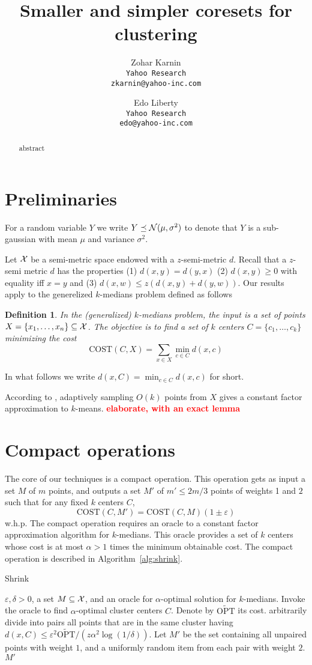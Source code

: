 \documentclass[11pt]{article}
\title{Smaller and simpler coresets for clustering}
\author{
Zohar Karnin\\ \texttt{Yahoo Research}\\ \texttt{\small zkarnin@yahoo-inc.com}
\and
Edo Liberty\\ \texttt{Yahoo Research}\\ \texttt{\small edo@yahoo-inc.com}
}
\date\nonumber
\newtheorem{definition} {Definition}
\newcommand{\eps}{\varepsilon}
\newcommand{\note}[1]{\textbf{\textcolor{red}{#1}}}
\newcommand{\cost}{\text{COST}}
\newcommand{\topt}{\widetilde{\text{OPT}}}
\newcommand{\N}{{\cal N}}
\begin{document}
\maketitle

\begin{abstract}
abstract\end{abstract}

\section{Preliminaries}
For a random variable $Y$ we write $Y \preceq \N(\mu,\sigma^2)$ to denote that $Y$ is a sub-gaussian with mean $\mu$ and variance $\sigma^2$.

Let $\cal X$ be a semi-metric space endowed with a $z$-semi-metric $d$. Recall that a $z$-semi metric $d$ has the properties (1) $d(x,y)=d(y,x)$ (2) $d(x,y) \geq 0$ with equality iff $x=y$ and (3) $d(x,w) \leq z(d(x,y)+d(y,w))$. Our results apply to the generelized $k$-medians problem defined as follows
\begin{definition}
In the (generalized) $k$-medians problem, the input is a set of points $X = \{x_1,\ldots,x_n\} \subseteq {\cal X}$. The objective is to find a set of $k$ centers $C = \{c_1,\ldots,c_k\}$ minimizing the cost 
$$\cost(C,X) = \sum_{x \in X} \min_{c \in C} d(x,c)$$
\end{definition}
In what follows we write $d(x,C) = \min_{c \in C}d(x,c)$ for short.

According to \cite{AggarwalDK09}, adaptively sampling $O(k)$ points from $X$ gives a constant factor approximation to $k$-means.
\note{elaborate, with an exact lemma}

\section{Compact operations}
The core of our techniques is a compact operation. This operation gets as input a set $M$ of $m$ points, and outputs a set $M'$ of $m' \leq 2m/3$ points of weights 1 and $2$ such that for any fixed $k$ centers $C$,
$$ \cost(C,M') = \cost(C,M) (1 \pm \eps) $$
w.h.p. The compact operation requires an oracle to a constant factor approximation algorithm for $k$-medians. This oracle provides a set of $k$ centers whose cost is at most $\alpha>1$ times the minimum obtainable cost.
The compact operation is described in Algorithm~\ref{alg:shrink}.


\begin{algorithm} 
\begin{algorithmic}
\caption{Shrink} \label{alg:shrink}
 $\eps,\delta >0$, a set $M \subseteq {\cal X}$, and an oracle for $\alpha$-optimal solution for $k$-medians.
\State Invoke the oracle to find $\alpha$-optimal cluster centers $C$. Denote by $\topt$ its cost.
\State arbitrarily divide into pairs all points that are in the same cluster having $d(x,C) \leq \eps^2 \topt / \left(z \alpha^2 \log(1/\delta)\right)$.
\State Let $M'$ be the set containing all unpaired points with weight $1$, and a uniformly random item from each pair with weight $2$.
 $M'$
\end{algorithmic}
\end{algorithm}
\end{document}
